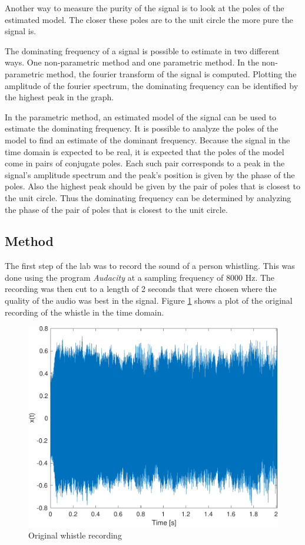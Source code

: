 \documentclass{IEEEtran}
\begin{document}
Another way to measure the purity of the signal is to look at the poles
of the estimated model. The closer these poles are to the unit circle
the more pure the signal is.

The dominating frequency of a signal is possible to estimate in two
different ways. One non-parametric method and one parametric method.
In the non-parametric method, the fourier transform of the signal is
computed. Plotting the amplitude of the fourier spectrum, the dominating
frequency can be identified by the highest peak in the graph.

In the parametric method, an estimated model of the signal can be used to
estimate the dominating frequency. It is possible to analyze the poles of the
model to find an estimate of the dominant frequency. Because the signal in the
time domain is expected to be real, it is expected that the poles of the
model come in pairs of conjugate poles. Each such pair corresponds to a
peak in the signal's amplitude spectrum and the peak's position is given
by the phase of the poles. Also the highest peak should be given by the pair
of poles that is closest to the unit circle. Thus the dominating frequency can
be determined by analyzing the phase of the pair of poles that is closest
to the unit circle.

\subsection{Method}
\label{sub:whistlemethod}
The first step of the lab was to record the sound of a person
whistling. This was done using the program \textit{Audacity}
\cite{audacity} at a sampling frequency of 8000 Hz. The recording was then
cut to a length of 2 seconds that were chosen where the quality of the
audio was best in the signal. Figure \ref{1:whistle_orig} shows a plot
of the original recording of the whistle in the time domain.

\begin{figure}[h]
  \centering
  \captionsetup{justification=centering}

  \includegraphics[width=0.8\columnwidth]{pictures/whistle_orig.pdf}
  \caption{Original whistle recording}
  \label{1:whistle_orig}

\end{figure}
\end{document}
